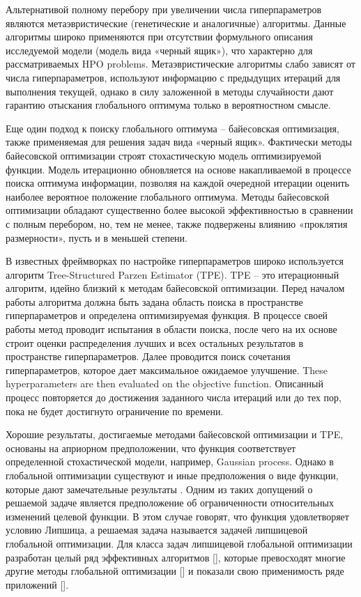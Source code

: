 \documentclass[preprint,12pt]{elsarticle}
\begin{document}
Альтернативой полному перебору при увеличении числа гиперпараметров являются метаэвристические (генетические и аналогичные) алгоритмы. Данные алгоритмы широко применяются при отсутствии формульного описания исследуемой модели (модель вида «черный ящик»), что характерно для рассматриваемых HPO problems. Метаэвристические алгоритмы слабо зависят от числа гиперпараметров, используют информацию с предыдущих итераций для выполнения текущей, однако в силу заложенной в методы случайности дают гарантию отыскания глобального оптимума только в вероятностном смысле.

Еще один подход к поиску глобального оптимума -- байесовская оптимизация, также применяемая для решения задач вида «черный ящик». Фактически методы байесовской оптимизации строят стохастическую модель оптимизируемой функции. Модель итерационно обновляется на основе накапливаемой в процессе поиска оптимума информации, позволяя на каждой очередной итерации оценить наиболее вероятное положение глобального оптимума. Методы байесовской оптимизации обладают существенно более высокой эффективностью в сравнении с полным перебором, но, тем не менее, также подвержены влиянию «проклятия размерности», пусть и в меньшей степени.

В известных фреймворках по настройке гиперпараметров широко используется алгоритм Tree-Structured Parzen Estimator (TPE). TPE -- это итерационный алгоритм, идейно близкий к методам байесовской оптимизации. Перед началом работы алгоритма должна быть задана область поиска в пространстве гиперпараметров и определена оптимизируемая функция. В процессе своей работы метод проводит испытания в области поиска, после чего на их основе строит оценки распределения лучших и всех остальных результатов в пространстве гиперпараметров. Далее проводится поиск сочетания гиперпараметров, которое дает максимальное ожидаемое улучшение. These hyperparameters are then evaluated on the objective function. Описанный процесс повторяется до достижения заданного числа итераций или до тех пор, пока не будет достигнуто ограничение по времени.

Хорошие результаты, достигаемые методами байесовской оптимизации и TPE, основаны на априорном предположении, что функция соответствует определенной стохастической модели, например, Gaussian process. Однако в глобальной оптимизации существуют и иные предположения о виде функции, которые дают замечательные результаты
.
Одним из таких допущений о решаемой задаче является предположение об ограниченности относительных изменений целевой функции. В этом случае говорят, что функция удовлетворяет условию Липшица, а решаемая задача называется задачей липшицевой глобальной оптимизации. Для класса задач липшицевой глобальной оптимизации разработан целый ряд эффективных алгоритмов [], которые превосходят многие другие методы глобальной оптимизации [] и показали свою применимость ряде приложений [].
 
\end{document}
